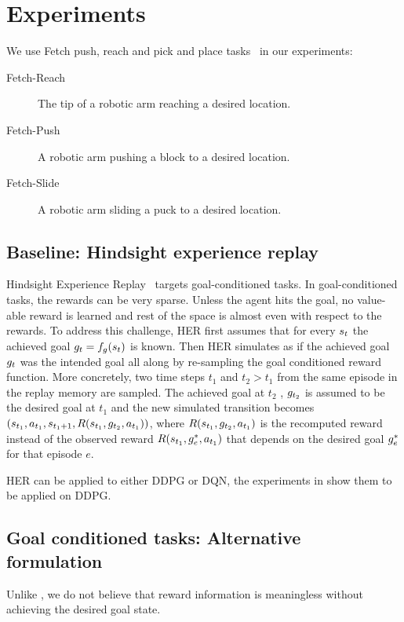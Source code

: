 
\section{Experiments}
We use Fetch push, reach and pick and place
tasks~\citep{plappert201802multigoalrl} in our experiments:
%
\begin{description}
  \item[Fetch-Reach] The tip of a robotic arm reaching a desired location.
  \item[Fetch-Push] A robotic arm pushing a block to a desired location.
  \item[Fetch-Slide] A robotic arm sliding a puck to a desired location.
\end{description}%
% 
\subsection{Baseline: Hindsight experience replay}
Hindsight Experience Replay~\cite{andrychowicz2016learning} targets
goal-conditioned tasks.
In goal-conditioned tasks, the rewards can be very sparse. Unless the agent hits
the goal, no value-able reward is learned and rest of the space is almost even
with respect to the rewards. To address this challenge, HER first assumes that
for every $s_t$ the achieved goal $g_t = f_g(s_t)$ is known.
Then HER simulates as if the achieved goal $g_t$ was the intended goal all
along by re-sampling the goal conditioned reward function.
More concretely, two time steps $t_1$ and $t_2 > t_1$ from the same episode in the replay memory are
sampled. The achieved goal at $t_2$ , $g_{t_2}$ is assumed to be the desired
goal at $t_1$ and the new simulated transition becomes $(s_{t_1},
a_{t_1}, s_{t_1 + 1}, R(s_{t_1}, g_{t_2}, a_{t_1}))$,
where $R(s_{t_1}, g_{t_2}, a_{t_1})$ is the recomputed reward
instead of the observed reward $R(s_{t_1}, g^*_{e}, a_{t_1})$ that
depends on the desired goal $g^*_{e}$ for that episode $e$.

HER can be applied to either DDPG or DQN, the experiments in
\citet{andrychowicz2016learning} show them to be applied on DDPG.

\subsection{Goal conditioned tasks: Alternative formulation}
Unlike \citet{andrychowicz2016learning}, we do not believe that reward
information is meaningless without achieving the desired goal state.

